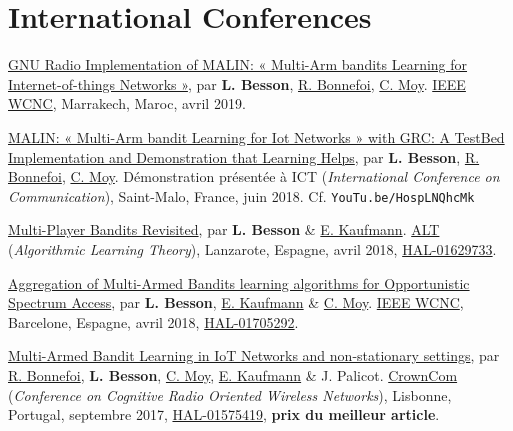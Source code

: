 \section*{International Conferences}
\renewcommand{\labelenumi}{[IC-\arabic{enumi}]}
\begin{etaremune}
\item
  \href{https://perso.crans.org/besson/articles/BBM__IEEE_WCNC_2019.pdf}{GNU
  Radio Implementation of MALIN: « Multi-Arm bandits Learning for
  Internet-of-things Networks »}, par \textbf{L. Besson},
  \href{https://remibonnefoi.wordpress.com/}{R. Bonnefoi},
  \href{https://moychris.wordpress.com/}{C. Moy}.
  \href{http://wcnc2019.ieee-wcnc.org/}{IEEE WCNC},
  Marrakech, Maroc, avril 2019.
\item
  \href{https://perso.crans.org/besson/articles/BBM__Demo_ICT_2018.pdf}{MALIN:
  « Multi-Arm bandit Learning for Iot Networks » with GRC: A TestBed
  Implementation and Demonstration that Learning Helps}, par \textbf{L.
  Besson}, \href{https://remibonnefoi.wordpress.com/}{R. Bonnefoi},
  \href{https://moychris.wordpress.com/}{C. Moy}. Démonstration
  présentée à ICT (\emph{International Conference on Communication}),
  Saint-Malo, France, juin 2018. Cf. \texttt{YouTu.be/HospLNQhcMk}
\item
  \href{https://hal.inria.fr/hal-01629733/document}{Multi-Player Bandits
  Revisited}, par \textbf{L. Besson} \&
  \href{http://chercheurs.lille.inria.fr/ekaufman/research.html}{E.
  Kaufmann}.
  \href{http://www.cs.cornell.edu/conferences/alt2018/accepted.html}{ALT}
  (\emph{Algorithmic Learning Theory}), Lanzarote, Espagne, avril 2018,
  \href{https://hal.inria.fr/hal-01629733}{HAL-01629733}.
\item
  \href{https://hal.inria.fr/hal-01705292/document}{Aggregation of
  Multi-Armed Bandits learning algorithms for Opportunistic Spectrum
  Access}, par \textbf{L. Besson},
  \href{http://chercheurs.lille.inria.fr/ekaufman/research.html}{E.
  Kaufmann} \& \href{https://moychris.wordpress.com/}{C. Moy}.
  \href{http://wcnc2018.ieee-wcnc.org/}{IEEE WCNC}, Barcelone, Espagne,
  avril 2018, \href{https://hal.inria.fr/hal-01705292}{HAL-01705292}.
\item
  \href{https://hal.inria.fr/hal-01575419/document}{Multi-Armed Bandit
  Learning in IoT Networks and non-stationary settings}, par
  \href{https://remibonnefoi.wordpress.com/}{R. Bonnefoi}, \textbf{L.
  Besson}, \href{https://moychris.wordpress.com/}{C. Moy},
  \href{http://chercheurs.lille.inria.fr/ekaufman/research.html}{E.
  Kaufmann} \& J. Palicot. \href{http://crowncom.org/2017/}{CrownCom}
  (\emph{Conference on Cognitive Radio Oriented Wireless Networks}),
  Lisbonne, Portugal, septembre 2017,
  \href{https://hal.inria.fr/hal-01575419}{HAL-01575419}, \textbf{prix
  du meilleur article}.
\end{etaremune}


